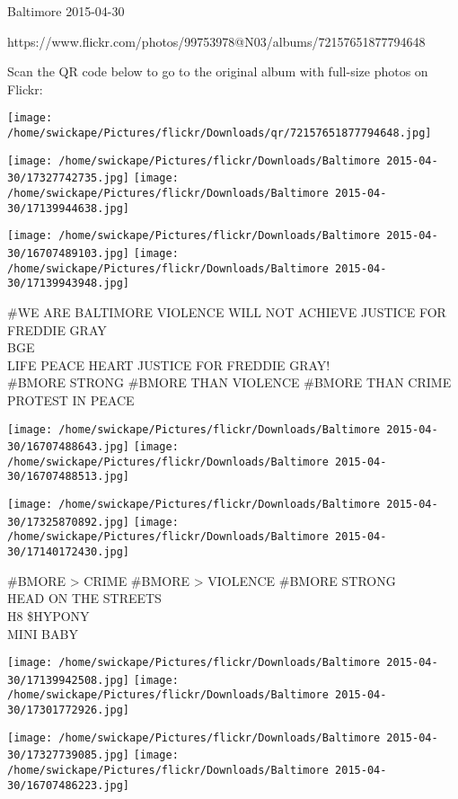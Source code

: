 \documentclass[10pt,letterpaper]{article}
\begin{document}
Baltimore 2015-04-30

https://www.flickr.com/photos/99753978@N03/albums/72157651877794648

Scan the QR code below to go to the original album with full-size photos on Flickr:

\texttt{[image: /home/swickape/Pictures/flickr/Downloads/qr/72157651877794648.jpg]}
\pagebreak

\texttt{[image: /home/swickape/Pictures/flickr/Downloads/Baltimore 2015-04-30/17327742735.jpg]}
\texttt{[image: /home/swickape/Pictures/flickr/Downloads/Baltimore 2015-04-30/17139944638.jpg]}

\texttt{[image: /home/swickape/Pictures/flickr/Downloads/Baltimore 2015-04-30/16707489103.jpg]}
\texttt{[image: /home/swickape/Pictures/flickr/Downloads/Baltimore 2015-04-30/17139943948.jpg]}

\#WE ARE BALTIMORE VIOLENCE WILL NOT ACHIEVE JUSTICE FOR FREDDIE GRAY\\
BGE\\
LIFE PEACE HEART JUSTICE FOR FREDDIE GRAY!\\
\#BMORE STRONG \#BMORE THAN VIOLENCE \#BMORE THAN CRIME PROTEST IN PEACE\\
\pagebreak

\texttt{[image: /home/swickape/Pictures/flickr/Downloads/Baltimore 2015-04-30/16707488643.jpg]}
\texttt{[image: /home/swickape/Pictures/flickr/Downloads/Baltimore 2015-04-30/16707488513.jpg]}

\texttt{[image: /home/swickape/Pictures/flickr/Downloads/Baltimore 2015-04-30/17325870892.jpg]}
\texttt{[image: /home/swickape/Pictures/flickr/Downloads/Baltimore 2015-04-30/17140172430.jpg]}

\#BMORE > CRIME \#BMORE > VIOLENCE \#BMORE STRONG\\
HEAD ON THE STREETS\\
H8 \$HYPONY\\
MINI BABY\\
\pagebreak

\texttt{[image: /home/swickape/Pictures/flickr/Downloads/Baltimore 2015-04-30/17139942508.jpg]}
\texttt{[image: /home/swickape/Pictures/flickr/Downloads/Baltimore 2015-04-30/17301772926.jpg]}

\texttt{[image: /home/swickape/Pictures/flickr/Downloads/Baltimore 2015-04-30/17327739085.jpg]}
\texttt{[image: /home/swickape/Pictures/flickr/Downloads/Baltimore 2015-04-30/16707486223.jpg]}
\end{document}
